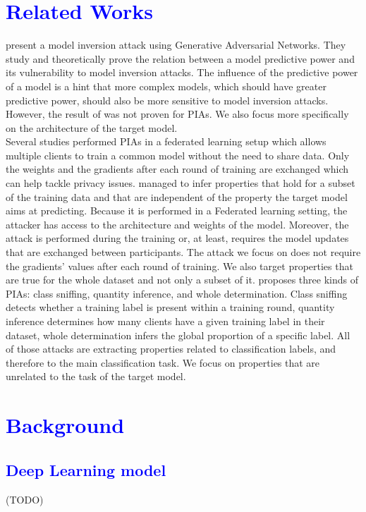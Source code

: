 \documentclass[11pt]{article}
\begin{document}
\section{\textcolor{blue}{Related Works}}

\citet{Zhang2019} present a model inversion attack using Generative Adversarial Networks. They study and theoretically prove the relation between a model predictive power and its vulnerability to model inversion attacks. The influence of the predictive power of a model is a hint that more complex models, which should have greater predictive power, should also be more sensitive to model inversion attacks. However, the result of \citet{Zhang2019} was not proven for PIAs. We also focus more specifically on the architecture of the target model.\\
Several studies \cite{Melis2019, Wang2019} performed PIAs in a federated learning setup which allows multiple clients to train a common model without the need to share data. Only the weights and the gradients after each round of training are exchanged which can help tackle privacy issues. \citet{Melis2019} managed to infer properties that hold for a subset of the training data and that are independent of the property the target model aims at predicting. Because it is performed in a Federated learning setting, the attacker has access to the architecture and weights of the model. Moreover, the attack is performed during the training or, at least, requires the model updates that are exchanged between participants. The attack we focus on does not require the gradients' values after each round of training. We also target properties that are true for the whole dataset and not only a subset of it. \cite{Wang2019} proposes three kinds of PIAs: class sniffing, quantity inference, and whole determination. Class sniffing detects whether a training label is present within a training round, quantity inference determines how many clients have a given training label in their dataset, whole determination infers the global proportion of a specific label. All of those attacks are extracting properties related to classification labels, and therefore to the main classification task. We focus on properties that are unrelated to the task of the target model.


\section{\textcolor{blue}{Background}}

\subsection{\textcolor{blue}{Deep Learning model}}
(TODO)
\end{document}
